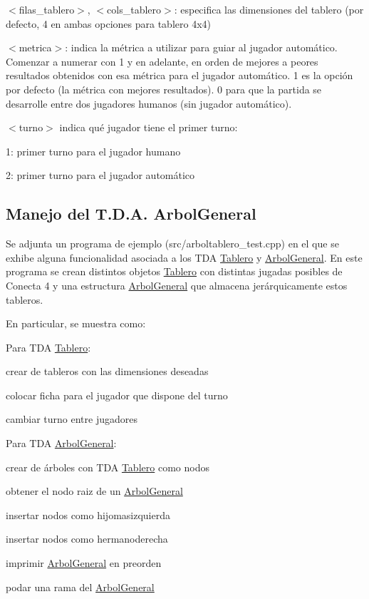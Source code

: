 \begin{DoxyItemize}
\item {\ttfamily $<$filas\-\_\-tablero$>$, $<$cols\-\_\-tablero$>$}\-: especifica las dimensiones del tablero (por defecto, 4 en ambas opciones para tablero 4x4)
\item {\ttfamily $<$metrica$>$}\-: indica la métrica a utilizar para guiar al jugador automático. Comenzar a numerar con 1 y en adelante, en orden de mejores a peores resultados obtenidos con esa métrica para el jugador automático. 1 es la opción por defecto (la métrica con mejores resultados). 0 para que la partida se desarrolle entre dos jugadores humanos (sin jugador automático).
\item {\ttfamily $<$turno$>$} indica qué jugador tiene el primer turno\-:
\begin{DoxyItemize}
\item 1\-: primer turno para el jugador humano
\item 2\-: primer turno para el jugador automático
\end{DoxyItemize}
\end{DoxyItemize}\hypertarget{index_ArbolGeneral}{}\subsection{Manejo del T.\-D.\-A. Arbol\-General}\label{index_ArbolGeneral}
Se adjunta un programa de ejemplo ({\ttfamily src/arboltablero\-\_\-test.\-cpp}) en el que se exhibe alguna funcionalidad asociada a los T\-D\-A \hyperlink{classTablero}{Tablero} y \hyperlink{classArbolGeneral}{Arbol\-General}. En este programa se crean distintos objetos \hyperlink{classTablero}{Tablero} con distintas jugadas posibles de Conecta 4 y una estructura \hyperlink{classArbolGeneral}{Arbol\-General} que almacena jerárquicamente estos tableros.

En particular, se muestra como\-:

Para T\-D\-A \hyperlink{classTablero}{Tablero}\-:
\begin{DoxyItemize}
\item crear de tableros con las dimensiones deseadas
\item colocar ficha para el jugador que dispone del turno
\item cambiar turno entre jugadores
\end{DoxyItemize}

Para T\-D\-A \hyperlink{classArbolGeneral}{Arbol\-General}\-:
\begin{DoxyItemize}
\item crear de árboles con T\-D\-A \hyperlink{classTablero}{Tablero} como nodos
\item obtener el nodo raiz de un \hyperlink{classArbolGeneral}{Arbol\-General}
\item insertar nodos como hijomasizquierda
\item insertar nodos como hermanoderecha
\item imprimir \hyperlink{classArbolGeneral}{Arbol\-General} en preorden
\item podar una rama del \hyperlink{classArbolGeneral}{Arbol\-General}
\end{DoxyItemize}


